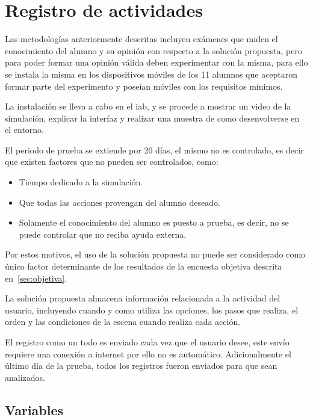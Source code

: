 \section{Registro de actividades}
\label{sec:registro}

Las metodologías anteriormente descritas incluyen exámenes que miden el
conocimiento del alumno y su opinión con respecto a la solución propuesta, pero
para poder formar una opinión válida deben experimentar con la misma, para ello
se instala la misma en los dispositivos móviles de los 11 alumnos que aceptaron
formar parte del experimento y poseían móviles con los requisitos mínimos.

La instalación se lleva a cabo en el \Gls{iab}, y se procede a mostrar un video
de la simulación, explicar la interfaz y realizar una muestra de como
desenvolverse en el entorno.

El periodo de prueba se extiende por 20 días, el mismo no es controlado, es
decir que existen factores que no pueden ser controlados, como:

\begin{itemize}
    \item Tiempo dedicado a la simulación.
    \item Que todas las acciones provengan del alumno deseado.
    \item Solamente el conocimiento del alumno es puesto a prueba, es decir, no
        se puede controlar que no reciba ayuda externa.
\end{itemize}

Por estos motivos, el uso de la solución propuesta no puede ser considerado
como único factor determinante de los resultados de la encuesta objetiva
descrita en~\ref{sec:objetiva}.

La solución propuesta almacena información relacionada a la actividad del
usuario, incluyendo cuando y como utiliza las opciones, los pasos que realiza,
el orden y las condiciones de la escena cuando realiza cada acción.

El registro como un todo es enviado cada vez que el usuario desee, este envío
requiere una conexión a internet por ello no es automático. Adicionalmente el
último día de la prueba, todos los registros fueron enviados para que sean
analizados.


\subsection{Variables}

